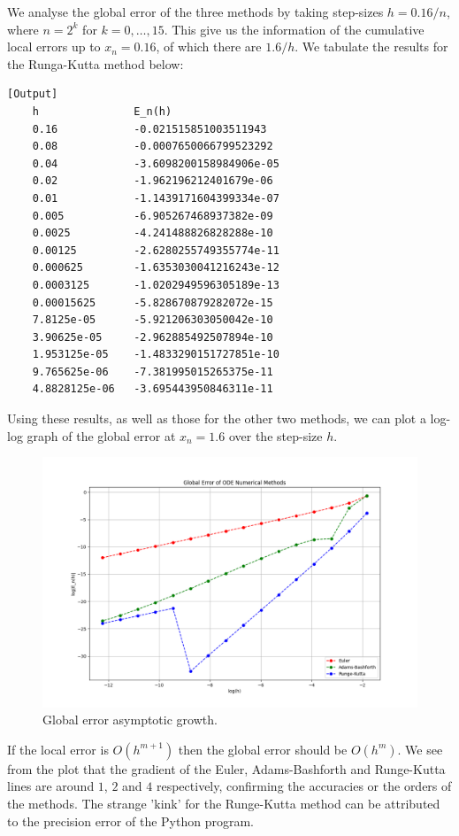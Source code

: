 \documentclass{article}
\begin{document}
We analyse the global error of the three methods by taking step-sizes \(h = 0.16 / n\), where \(n = 2^k\) for \(k = 0, \dots, 15\). This give us the information of the cumulative local errors up to \(x_n = 0.16\), of which there are \(1.6 / h\). We tabulate the results for the Runga-Kutta method below:

\begin{verbatim}[Output]
    h               E_n(h)
    0.16            -0.021515851003511943
    0.08            -0.0007650066799523292
    0.04            -3.6098200158984906e-05
    0.02            -1.962196212401679e-06
    0.01            -1.1439171604399334e-07
    0.005           -6.905267468937382e-09
    0.0025          -4.241488826828288e-10
    0.00125         -2.6280255749355774e-11
    0.000625        -1.6353030041216243e-12
    0.0003125       -1.0202949596305189e-13
    0.00015625      -5.828670879282072e-15
    7.8125e-05      -5.921206303050042e-10
    3.90625e-05     -2.962885492507894e-10
    1.953125e-05    -1.4833290151727851e-10
    9.765625e-06    -7.381995015265375e-11
    4.8828125e-06   -3.695443950846311e-11
\end{verbatim}

Using these results, as well as those for the other two methods, we can plot a log-log graph of the global error at \(x_n = 1.6\) over the step-size \(h\).

\begin{figure}
    \centering
    \includegraphics[width=1.0\textwidth]{images/error_comparison.png}
    \caption{Global error asymptotic growth.}
\end{figure}

If the local error is \(O(h^{m+1})\) then the global error should be \(O(h^m)\). We see from the plot that the gradient of the Euler, Adams-Bashforth and Runge-Kutta lines are around \(1\), \(2\) and \(4\) respectively, confirming the accuracies or the orders of the methods. The strange 'kink' for the Runge-Kutta method can be attributed to the precision error of the Python program.
\end{document}
